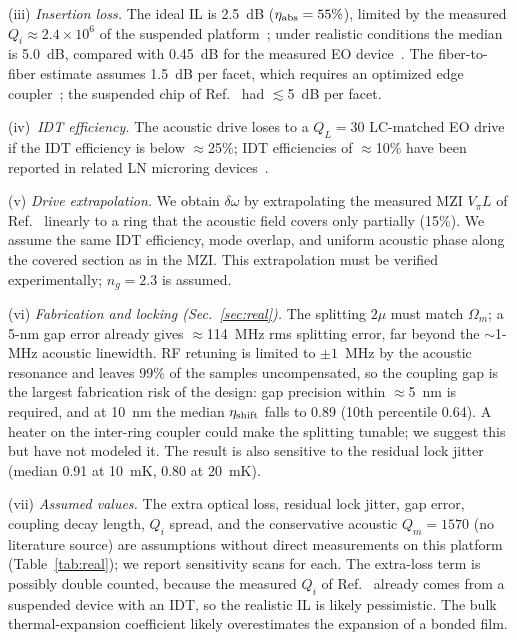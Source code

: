 \documentclass[aps,prapplied,reprint,superscriptaddress,amsmath,amssymb,floatfix]{revtex4-2}
\newcommand{\etash}{\eta_{\rm shift}}
\newcommand{\etaabs}{\eta_{\rm abs}}
\begin{document}
(iii) \emph{Insertion loss.} The ideal IL is 2.5~dB ($\etaabs=55\%$), limited by the measured $Q_i\approx2.4\times10^6$ of the suspended platform~\cite{Shao2019}; under realistic conditions the median is 5.0~dB, compared with 0.45~dB for the measured EO device~\cite{Hu2021}. The fiber-to-fiber estimate assumes 1.5~dB per facet, which requires an optimized edge coupler~\cite{Jia2023}; the suspended chip of Ref.~\cite{Shao2019} had $\lesssim$5~dB per facet.

(iv)~\emph{IDT efficiency.} The acoustic drive loses to a $Q_L=30$ LC-matched EO drive if the IDT efficiency is below $\approx$25\%; IDT efficiencies of $\approx$10\% have been reported in related LN microring devices~\cite{Xu2025b}.

(v) \emph{Drive extrapolation.} We obtain $\delta\omega$ by extrapolating the measured MZI $V_\pi L$ of Ref.~\cite{Shao2019} linearly to a ring that the acoustic field covers only partially (15\%). We assume the same IDT efficiency, mode overlap, and uniform acoustic phase along the covered section as in the MZI. This extrapolation must be verified experimentally; $n_g=2.3$ is assumed.

(vi) \emph{Fabrication and locking (Sec.~\ref{sec:real}).} The splitting $2\mu$ must match $\Omega_m$; a 5-nm gap error already gives $\approx$114~MHz rms splitting error, far beyond the $\sim$1-MHz acoustic linewidth. RF retuning is limited to $\pm1$~MHz by the acoustic resonance and leaves 99\% of the samples uncompensated, so the coupling gap is the largest fabrication risk of the design: gap precision within $\approx$5~nm is required, and at 10~nm the median $\etash$ falls to 0.89 (10th percentile 0.64). A heater on the inter-ring coupler could make the splitting tunable; we suggest this but have not modeled it. The result is also sensitive to the residual lock jitter (median 0.91 at 10~mK, 0.80 at 20~mK).

(vii) \emph{Assumed values.} The extra optical loss, residual lock jitter, gap error, coupling decay length, $Q_i$ spread, and the conservative acoustic $Q_m=1570$ (no literature source) are assumptions without direct measurements on this platform (Table~\ref{tab:real}); we report sensitivity scans for each. The extra-loss term is possibly double counted, because the measured $Q_i$ of Ref.~\cite{Shao2019} already comes from a suspended device with an IDT, so the realistic IL is likely pessimistic. The bulk thermal-expansion coefficient likely overestimates the expansion of a bonded film.
\end{document}
